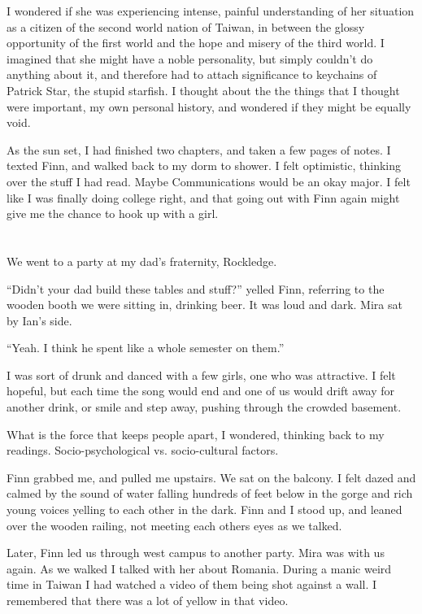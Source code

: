 I wondered if she was experiencing intense, painful understanding of her
situation as a citizen of the second world nation of Taiwan, in between the
glossy opportunity of the first world and the hope and misery of the third
world.  I imagined that she might have a noble personality, but simply couldn't
do anything about it, and therefore had to attach significance to keychains of
Patrick Star, the stupid starfish.  I thought about the the things that I
thought were important, my own personal history, and wondered if they might be
equally void.

As the sun set, I had finished two chapters, and taken a few pages of notes.  I
texted Finn, and walked back to my dorm to shower.  I felt optimistic, thinking
over the stuff I had read.  Maybe Communications would be an okay major.  I felt
like I was finally doing college right, and that going out with Finn again might
give me the chance to hook up with a girl.

\section{}

We went to a party at my dad's fraternity, Rockledge.  

``Didn't your dad build these tables and stuff?'' yelled Finn, referring to the
wooden booth we were sitting in, drinking beer.  It was loud and dark.  Mira sat by
Ian's side.  

``Yeah.  I think he spent like a whole semester on them.''

I was sort of drunk and danced with a few girls, one who was attractive.  I felt
hopeful, but each time the song would end and one of us would drift away for
another drink, or smile and step away, pushing through the crowded basement.  

What is the force that keeps people apart, I wondered, thinking back to my
readings.  Socio-psychological vs. socio-cultural factors. 

Finn grabbed me, and pulled me upstairs.  We sat on the balcony.  I felt dazed
and calmed by the sound of water falling hundreds of feet below in the gorge and
rich young voices yelling to each other in the dark.  Finn and I stood up, and
leaned over the wooden railing, not meeting each others eyes as we talked.

Later, Finn led us through west campus to another party.  Mira was with us
again.  As we walked I talked with her about Romania.  During a manic weird time
in Taiwan I had watched a video of them being shot against a wall.  I remembered
that there was a lot of yellow in that video.  

